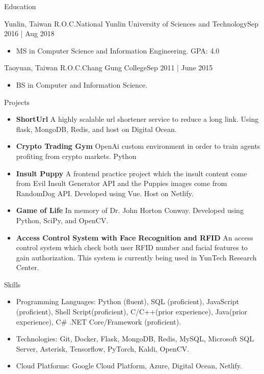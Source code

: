 \documentclass[]{mcdowellcv}
\begin{document}
\begin{cvsection}{Education}
	\begin{cvsubsection}{Yunlin, Taiwan R.O.C.}{National Yunlin University of Sciences and Technology}{Sep 2016 | Aug 2018}
		\begin{itemize}
			\item MS in Computer Science and Information Engineering. GPA: 4.0
		\end{itemize}
	\end{cvsubsection}
	\begin{cvsubsection}{Taoyuan, Taiwan R.O.C.}{Chang Gung College}{Sep 2011 | June 2015}
		\begin{itemize}
			\item BS in Computer and Information Science.
		\end{itemize}
	\end{cvsubsection}
\end{cvsection}
\begin{cvsection}{Projects}
	\begin{cvsubsection}{}{}{}
		\begin{itemize}
			\setlength\itemsep{3pt}
			\item \textbf{ShortUrl}  A highly scalable url shortener service to reduce a long link. Using flask, MongoDB, Redis, and host on Digital Ocean.
			\item \textbf{Crypto Trading Gym}  OpenAi custom environment in order to train agents profiting from crypto markets. Python
			\item \textbf{Insult Puppy}  A frontend practice project which the insult content come from Evil Insult Generator API and the Puppies images come from RandomDog API. Developed using Vue. Host on Netlify.
			\item \textbf{Game of Life}  In memory of Dr. John Horton Conway. Developed using Python, SciPy, and OpenCV.
			\item \textbf{Access Control System with Face Recognition and RFID}  An access control system which check both user RFID number and facial features to gain authorization. This system is currently being used in YunTech Research Center.
		\end{itemize}
	\end{cvsubsection}
\end{cvsection}
\begin{cvsection}{Skills}
	\begin{cvsubsection}{}{}{}
		\begin{itemize}
			\item Programming Languages:  Python (fluent), SQL (proficient), JavaScript (proficient), Shell Script(proficient), C/C++(prior experience), Java(prior experience), C\# .NET Core/Framework (proficient).
			\item Technologies:  Git, Docker, Flask, MongoDB, Redis, MySQL, Microsoft SQL Server, Asterisk, Tensorflow, PyTorch, Kaldi, OpenCV.
			\item Cloud Platforms:  Google Cloud Platform, Azure, Digital Ocean, Netlify.
		\end{itemize}
	\end{cvsubsection}
\end{cvsection}
\end{document}
